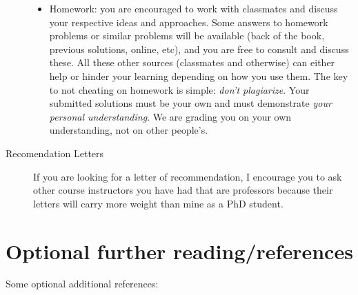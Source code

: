 \documentclass{article}
\begin{document}
\begin{description}
\begin{itemize}
\item Homework: you are encouraged to work with classmates and discuss your respective ideas and approaches. Some answers to homework problems or similar problems will be available (back of the book, previous solutions, online, etc), and you are free to consult and discuss these. All these other sources (classmates and otherwise) can either help or hinder your learning depending on how you use them. The key to not cheating on homework is simple: \emph{don't plagiarize}. Your submitted solutions must be your own and must demonstrate \emph{your personal understanding}. We are grading you on your own understanding, not on other people's.
\end{itemize}
\item[{Recomendation Letters}] If you are looking for a letter of recommendation, I encourage you to ask other course instructors you have had that are professors because their letters will carry more weight than mine as a PhD student.
\end{description}

\section{Optional further reading/references}
\label{references}

Some optional additional references:
\end{document}
